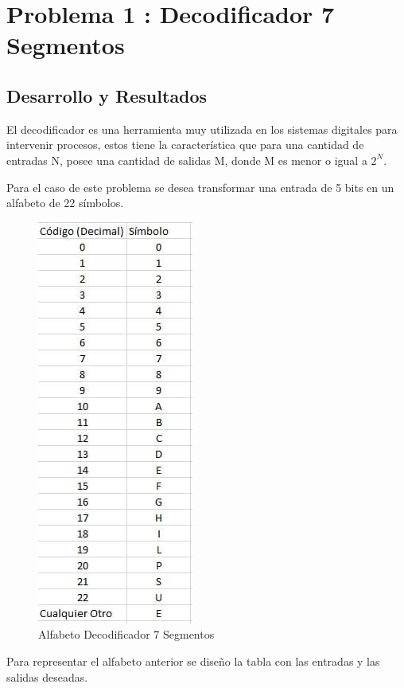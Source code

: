 \documentclass[journal]{IEEEtran}
\begin{document}
	\section{Problema 1 : Decodificador 7 Segmentos} 
	\subsection{Desarrollo y Resultados}
	El decodificador es una herramienta muy utilizada en los sistemas digitales para intervenir procesos, estos tiene la característica que para una cantidad de entradas N, posee una cantidad de salidas M, donde M es menor o igual a $2^{N}$.
	
	Para el caso de este problema se desea transformar una entrada de 5 bits en un alfabeto de 22 símbolos. 
	
	\begin{figure}[htb]
		\centering
		\includegraphics[scale = 0.5]{img/p1/alf.jpg}
		\caption{Alfabeto Decodificador 7 Segmentos}
		\label{fig:Alfabeto}
	\end{figure}
	
	Para representar el alfabeto anterior se diseño la tabla con las entradas y las salidas deseadas. 
	
\end{document}
